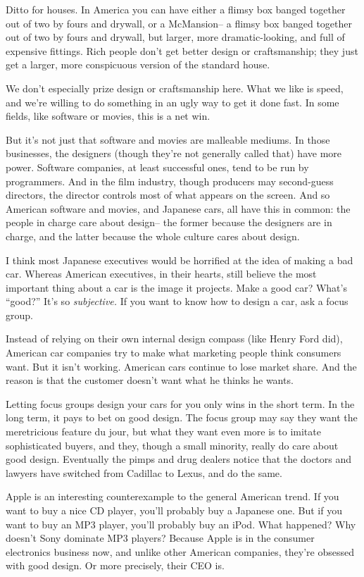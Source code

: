 Ditto for houses. In America you can have either a flimsy box banged
together out of two by fours and drywall, or a McMansion-- a flimsy box
banged together out of two by fours and drywall, but larger, more
dramatic-looking, and full of expensive fittings. Rich people don't get
better design or craftsmanship; they just get a larger, more conspicuous
version of the standard house.

We don't especially prize design or craftsmanship here. What we like is
speed, and we're willing to do something in an ugly way to get it done
fast. In some fields, like software or movies, this is a net win.

But it's not just that software and movies are malleable mediums. In
those businesses, the designers (though they're not generally called
that) have more power. Software companies, at least successful ones,
tend to be run by programmers. And in the film industry, though
producers may second-guess directors, the director controls most of what
appears on the screen. And so American software and movies, and Japanese
cars, all have this in common: the people in charge care about design--
the former because the designers are in charge, and the latter because
the whole culture cares about design.

I think most Japanese executives would be horrified at the idea of
making a bad car. Whereas American executives, in their hearts, still
believe the most important thing about a car is the image it projects.
Make a good car? What's ``good?'' It's so \emph{subjective.} If you want
to know how to design a car, ask a focus group.

Instead of relying on their own internal design compass (like Henry Ford
did), American car companies try to make what marketing people think
consumers want. But it isn't working. American cars continue to lose
market share. And the reason is that the customer doesn't want what he
thinks he wants.

Letting focus groups design your cars for you only wins in the short
term. In the long term, it pays to bet on good design. The focus group
may say they want the meretricious feature du jour, but what they want
even more is to imitate sophisticated buyers, and they, though a small
minority, really do care about good design. Eventually the pimps and
drug dealers notice that the doctors and lawyers have switched from
Cadillac to Lexus, and do the same.

Apple is an interesting counterexample to the general American trend. If
you want to buy a nice CD player, you'll probably buy a Japanese one.
But if you want to buy an MP3 player, you'll probably buy an iPod. What
happened? Why doesn't Sony dominate MP3 players? Because Apple is in the
consumer electronics business now, and unlike other American companies,
they're obsessed with good design. Or more precisely, their CEO is.

